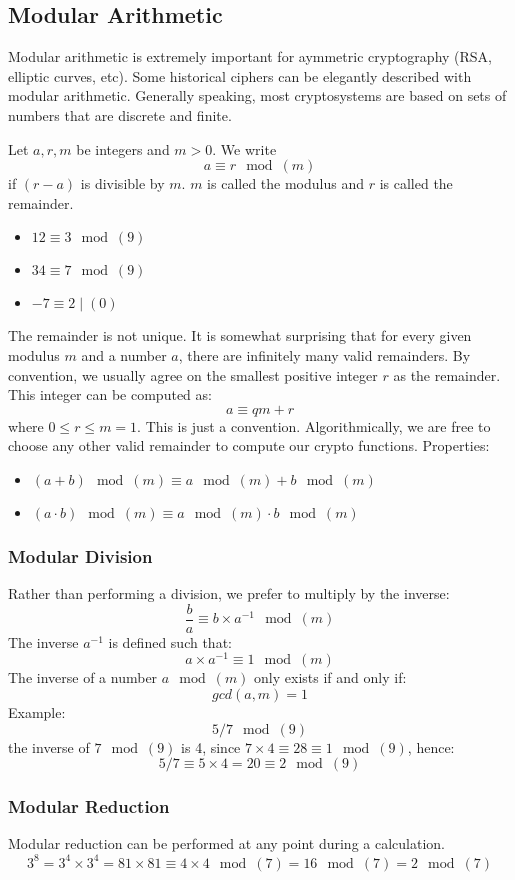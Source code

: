 \documentclass{math}
\begin{document}
\subsection*{Modular Arithmetic}
Modular arithmetic is extremely important for aymmetric cryptography (RSA,
elliptic curves, etc). Some historical ciphers can be elegantly described with
modular arithmetic. Generally speaking, most cryptosystems are based on sets of
numbers that are discrete and finite.
\par Let \( a,r,m \) be integers and \( m>0 \). We write
\[ a \equiv r\mod(m) \]
if \( (r-a) \) is divisible by \( m \). \( m \) is called the modulus and
\( r \) is called the remainder.
\begin{itemize}
  \item \( 12 \equiv 3\mod(9) \)
  \item \( 34 \equiv 7\mod(9) \)
  \item \( -7 \equiv 2\mid(0) \)
\end{itemize}
The remainder is not unique. It is somewhat surprising that for every given
modulus \( m \) and a number \( a \), there are infinitely many valid
remainders. By convention, we usually agree on the smallest positive integer
\( r \) as the remainder. This integer can be computed as:
\[ a \equiv qm+r \]
where \( 0\le r\le m=1 \). This is just a convention. Algorithmically, we are
free to choose any other valid remainder to compute our crypto functions.
Properties:
\begin{itemize}
  \item \( (a+b)\mod(m) \equiv a\mod(m)+b\mod(m) \)
  \item \( (a\cdot b)\mod(m) \equiv a\mod(m)\cdot b\mod(m) \)
\end{itemize}

\subsubsection*{Modular Division}
Rather than performing a division, we prefer to multiply by the inverse:
\[ \frac{b}{a}\equiv b\times a^{-1}\mod(m) \]
The inverse \( a^{-1} \) is defined such that:
\[ a\times a^{-1} \equiv 1\mod(m) \]
The inverse of a number \( a\mod(m) \) only exists if and only if:
\[ gcd(a,m) = 1 \]
Example:
\[ 5/7\mod(9) \]
the inverse of \( 7\mod(9) \) is 4, since \( 7\times4 \equiv 28 \equiv
1\mod(9) \), hence:
\[ 5/7 \equiv 5\times4 = 20 \equiv 2\mod(9) \]

\subsubsection*{Modular Reduction}
Modular reduction can be performed at any point during a calculation.
\[ 3^8 = 3^4\times3^4 = 81\times81 \equiv 4\times4\mod(7) = 16\mod(7) =
  2\mod(7) \]
\end{document}
